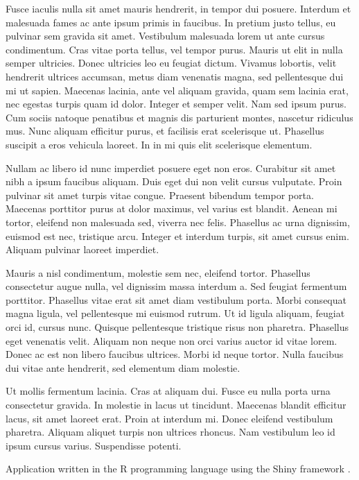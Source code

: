 \documentclass[11pt,]{article}
\begin{document}
Fusce iaculis nulla sit amet mauris hendrerit, in tempor dui posuere.
Interdum et malesuada fames ac ante ipsum primis in faucibus. In pretium
justo tellus, eu pulvinar sem gravida sit amet. Vestibulum malesuada
lorem ut ante cursus condimentum. Cras vitae porta tellus, vel tempor
purus. Mauris ut elit in nulla semper ultricies. Donec ultricies leo eu
feugiat dictum. Vivamus lobortis, velit hendrerit ultrices accumsan,
metus diam venenatis magna, sed pellentesque dui mi ut sapien. Maecenas
lacinia, ante vel aliquam gravida, quam sem lacinia erat, nec egestas
turpis quam id dolor. Integer et semper velit. Nam sed ipsum purus. Cum
sociis natoque penatibus et magnis dis parturient montes, nascetur
ridiculus mus. Nunc aliquam efficitur purus, et facilisis erat
scelerisque ut. Phasellus suscipit a eros vehicula laoreet. In in mi
quis elit scelerisque elementum.

Nullam ac libero id nunc imperdiet posuere eget non eros. Curabitur sit
amet nibh a ipsum faucibus aliquam. Duis eget dui non velit cursus
vulputate. Proin pulvinar sit amet turpis vitae congue. Praesent
bibendum tempor porta. Maecenas porttitor purus at dolor maximus, vel
varius est blandit. Aenean mi tortor, eleifend non malesuada sed,
viverra nec felis. Phasellus ac urna dignissim, euismod est nec,
tristique arcu. Integer et interdum turpis, sit amet cursus enim.
Aliquam pulvinar laoreet imperdiet.

Mauris a nisl condimentum, molestie sem nec, eleifend tortor. Phasellus
consectetur augue nulla, vel dignissim massa interdum a. Sed feugiat
fermentum porttitor. Phasellus vitae erat sit amet diam vestibulum
porta. Morbi consequat magna ligula, vel pellentesque mi euismod rutrum.
Ut id ligula aliquam, feugiat orci id, cursus nunc. Quisque pellentesque
tristique risus non pharetra. Phasellus eget venenatis velit. Aliquam
non neque non orci varius auctor id vitae lorem. Donec ac est non libero
faucibus ultrices. Morbi id neque tortor. Nulla faucibus dui vitae ante
hendrerit, sed elementum diam molestie.

Ut mollis fermentum lacinia. Cras at aliquam dui. Fusce eu nulla porta
urna consectetur gravida. In molestie in lacus ut tincidunt. Maecenas
blandit efficitur lacus, sit amet laoreet erat. Proin at interdum mi.
Donec eleifend vestibulum pharetra. Aliquam aliquet turpis non ultrices
rhoncus. Nam vestibulum leo id ipsum cursus varius. Suspendisse potenti.

Application written in the R programming language \citep{RCoreTeam}
using the Shiny framework \citep{Chang2015}.

\newpage

\renewcommand\refname{REFERENCES}

\end{document}

